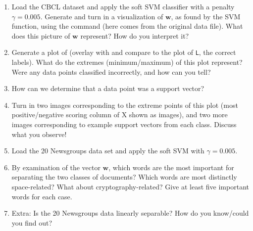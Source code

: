 \documentclass[11pt,noanswers,addpoints]{exam}
\newcommand{\w}{\mathbf w}
\begin{document}
\begin{enumerate}
\item Load the CBCL dataset and apply the soft SVM classifier with a penalty $\gamma = 0.005$. 
Generate and turn in a visualization of $\w$, as found by the SVM function,
using the command  (here  comes from the original data file). What does this picture of $\w$ represent? How do you interpret it?

\item Generate a plot of  (overlay with and compare to the plot of \texttt{L}, the correct labels).
What do the extremes (minimum/maximum) of this plot represent? Were any data points classified incorrectly,
and how can you tell? 

\item How can we determine that a data point was a support vector?

\item Turn in two images corresponding to the extreme points of this plot (most positive/negative scoring column of X shown as images), and two more images corresponding to
example support vectors from each class. Discuss what you observe!

\item Load the 20 Newsgroups data set and apply the soft SVM with $\gamma = 0.005$.

\item By examination of the vector $\w$,
which words are the most important for separating the two classes of documents? Which words are most distinctly space-related?
What about cryptography-related? Give at least five important words for each case.

\item Extra: Is the 20 Newsgroups data linearly separable? How do you know/could you find out?

\end{enumerate}
\end{document}
